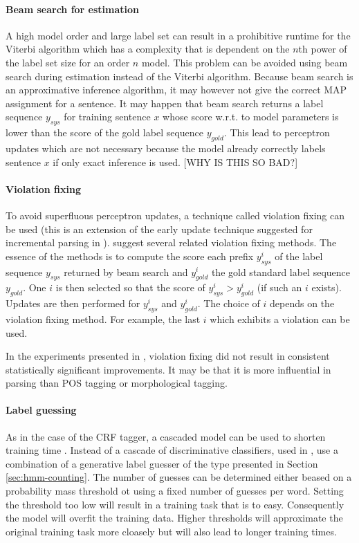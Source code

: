 \paragraph{Beam search for estimation} A high model order and large
label set can result in a prohibitive runtime for the Viterbi
algorithm which has a complexity that is dependent on the $n$th power
of the label set size for an order $n$ model. This problem can be
avoided using beam search during estimation instead of the Viterbi
algorithm. Because beam search is an approximative inference
algorithm, it may however not give the correct MAP assignment for a
sentence. It may happen that beam search returns a label sequence
$y_{sys}$ for training sentence $x$ whose score w.r.t. to model
parameters is lower than the score of the gold label sequence
$y_{gold}$. This lead to perceptron updates which are not necessary
because the model already correctly labels sentence $x$ if only exact
inference is used. [WHY IS THIS SO BAD?]

\paragraph{Violation fixing} To avoid superfluous perceptron updates,
a technique called violation fixing can be used \citep{Huang2012}
(this is an extension of the early update technique suggested for
incremental parsing in \cite{Collins2004}). \cite{Huang2012} suggest
several related violation fixing methods. The essence of the methods
is to compute the score each prefix $y_{sys}^i$ of the label sequence
$y_{sys}$ returned by beam search and $y_{gold}^i$ the gold standard
label sequence $y_{gold}$. One $i$ is then selected so that the score
of $y_{sys}^i > y_{gold}^i$ (if such an $i$ exists). Updates are then
performed for $y_{sys}^i$ and $y_{gold}^i$. The choice of $i$ depends
on the violation fixing method. For example, the last $i$ which
exhibits a violation can be used.

In the experiments presented in \cite{Silfverberg2015}, violation
fixing did not result in consistent statistically significant
improvements. It may be that it is more influential in parsing than
POS tagging or morphological tagging.

\paragraph{Label guessing} As in the case of the CRF tagger, a
cascaded model can be used to shorten training time
\citep{Silfverberg2015}. Instead of a cascade of discriminative
classifiers, used in \citep{Muller2013}, \cite{Silfverberg2015} use a
combination of a generative label guesser of the type presented in
Section \ref{sec:hmm-counting}. The number of guesses can be
determined either beased on a probability mass threshold ot using a
fixed number of guesses per word. Setting the threshold too low will
result in a training task that is to easy. Consequently the model will
overfit the training data. Higher thresholds will approximate the
original training task more cloasely but will also lead to longer
training times.


